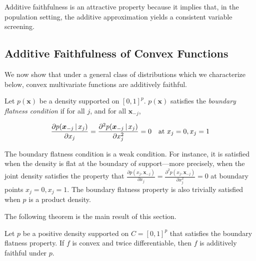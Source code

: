 
Additive faithfulness is an attractive property because it implies
that, in the population setting, the additive approximation yields
a consistent variable screening.

\subsection{Additive Faithfulness of Convex Functions}

We now show that under a general class of distributions which we
characterize below, convex multivariate functions are additively
faithful.

\begin{definition}
\label{defn:boundary-point}
Let $p(\mathbf{x})$ be a density supported on $[0,1]^p$. $p(\mathbf{x})$ satisfies
the \emph{boundary flatness condition} if for all $j$, and for all $\mathbf{x}_{-j}$,

\begin{equation}
\frac{\partial p(\mbox{\boldmath $x$}_{-j} {\,|\,} x_j)}{\partial x_j}  =  
\frac{\partial^2 p(\mbox{\boldmath $x$}_{-j} {\,|\,} x_j)}{\partial x_j^2} = 0
\quad \textrm{at } x_j = 0, x_j = 1
\end{equation}

\end{definition}



The boundary flatness condition is a weak condition. For instance, it is
satisfied when the density is flat at the boundary of support---more
precisely, when the joint density satisfies the property that
$\frac{\partial p(x_j,\mathbf{x}_{-j})}{\partial x_j} =
\frac{\partial^2 p(x_j, \mathbf{x}_{-j})}{\partial x_j^2} = 0$ at boundary
points $x_j = 0, x_j=1$. The boundary flatness property is also
trivially satisfied when $p$ is a product density.

The following theorem is the main result of this section.

\begin{theorem}
\label{thm:convex_faithful}
Let $p$ be a positive density supported on $C=[0,1]^p$ that satisfies
the boundary flatness property. 
If $f$ is convex and twice differentiable, then $f$ is additively faithful under $p$.
\end{theorem}


